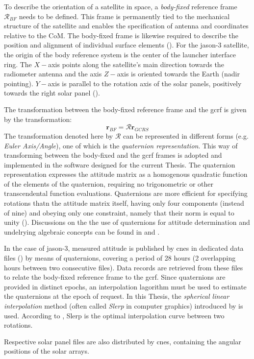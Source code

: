 To describe the orientation of a satellite in space, a \emph{body-fixed} reference 
frame $\mathcal{R}_{BF}$ needs to be defined. This frame is permanently tied to the mechanical 
structure of the satellite and enables the specification of antenna and coordinates 
relative to the CoM. The body-fixed frame is likewise required to describe the 
position and alignment of individual surface elements (\cite{Montenbruck2015}).
For the \gls{jason}-3 satellite, the origin of the body reference system is the center of the launcher interface ring. 
The $X-$axis points along the satellite's main direction towards the radiometer 
antenna and the axis $Z-$axis is oriented towards the Earth (nadir pointing). 
$Y-$axis is parallel to the rotation axis of the solar panels, positively 
towards the right solar panel (\cite{Zeitlhofler2019}).

The transformation between the body-fixed reference frame and the \gls{gcrf} is 
given by the transformation:
\begin{equation}
  \bm{r}_{BF} = \mathcal{R} \bm{r}_{GCRS}
\end{equation}
The transformation denoted here by $\mathcal{R}$ can be represented in different 
forms (e.g. \emph{Euler Axis/Angle}), one of which is the 
\emph{quaternion representation}. This way of transforming between the body-fixed 
and the \gls{gcrf} frames is adopted and implemented in the software designed for 
the current Thesis. The quaternion representation expresses the attitude matrix as 
a homogenous quadratic function of the elements of the quaternion, requiring no 
trigonometric or other transcendental function evaluations. Quaternions are more 
efficient for specifying rotations thatn the attitude matrix itself, having only 
four components (instead of nine) and obeying only one constraint, namely that 
their norm is equal to unity (\cite{Markley2019}). Discussions on the the use of 
quaternions for attitude determination and undelrying algebraic concepts can be 
found in \cite{Yang2012} and \cite{Markley2019}.

In the case of \gls{jason}-3, measured attitude is published by \gls{cnes} in 
dedicated data files (\cite{Ferrage2020}) by means of quaternions, covering a 
period of 28 hours (2 overlapping hours between two consecutive files). Data records 
are retrieved from these files to relate the body-fixed reference frame to the 
\gls{gcrf}. Since quaternions are provided in distinct epochs, an interpolation 
lagorithm must be used to estimate the quaternions at the epoch of request. In this 
Thesis, the \emph{spherical linear interpolation} method (often called \emph{Slerp} in 
computer graphics) introduced by \cite{Shoemake1985} is used. According to \cite{Dam2000}, 
Slerp is the optimal interpolation curve between two rotations.

Respective solar panel files are also distributed by \gls{cnes}, containing the 
angular positions of the solar arrays.
